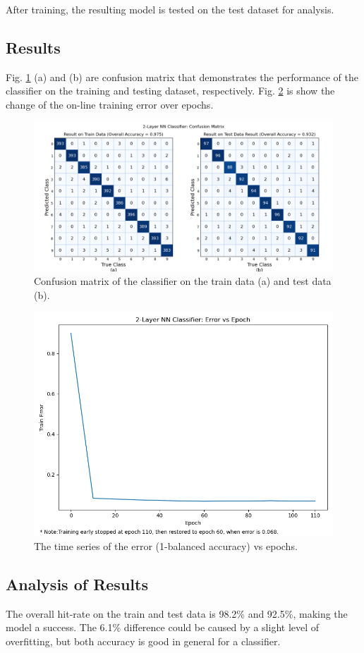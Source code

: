 \documentclass[11pt,titlepage]{article}
\begin{document}
After training, the resulting model is tested on the test dataset for analysis.

\subsection{Results}

Fig. \ref{fig:classifier_cm} (a) and (b) are confusion matrix that demonstrates the performance of the classifier on the training and testing dataset, respectively. Fig. \ref{fig:classifier_train} is show the change of the on-line training error over epochs. 

\begin{figure}[htb]
	\centering
	\includegraphics[width=\linewidth]{img/h3p1_cm}
	\caption{Confusion matrix of the classifier on the train data (a) and test data (b).}
	\label{fig:classifier_cm}
\end{figure}

\begin{figure}[htb]
	\centering
	\includegraphics[width=0.6\linewidth]{img/h3p1_train}
\caption{The time series of the error (1-balanced accuracy) vs epochs.}
\label{fig:classifier_train}
\end{figure}

\newpage
\subsection{Analysis of Results}
The overall hit-rate on the train and test data is 98.2\% and 92.5\%, making the model a success. The 6.1\% difference could be caused by a slight level of overfitting, but both accuracy is good in general for a classifier. 
\end{document}
